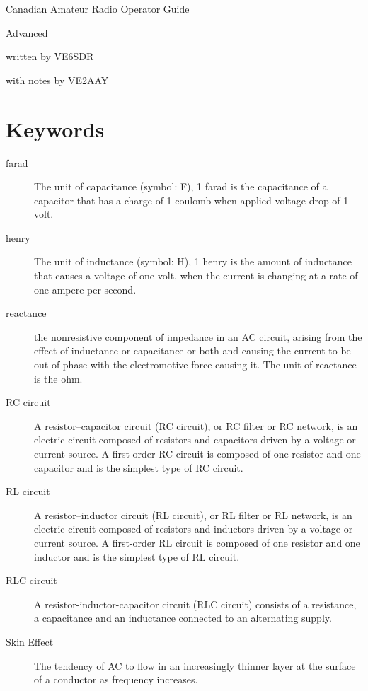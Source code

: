 \documentclass[letterpaper]{article}
\begin{document}
    \begin{center}
        \Large
        Canadian Amateur Radio Operator Guide

        Advanced

        \large
        written by VE6SDR

        with notes by VE2AAY
    \end{center}

    \tableofcontents
    \newpage

    \section*{Keywords}
        \begin{description}
            \item[farad] The unit of capacitance (symbol: F), 1 farad is the capacitance of a capacitor that has a charge of 1 coulomb when applied voltage drop of 1 volt.
            \item[henry] The unit of inductance (symbol: H), 1 henry is the amount of inductance that causes a voltage of one volt, when the current is changing at a rate of one ampere per second.
            \item[reactance] the nonresistive component of impedance in an AC circuit, arising from the effect of inductance or capacitance or both and causing the current to be out of phase with the electromotive force causing it.
                The unit of reactance is the ohm.
            \item[RC circuit] A resistor–capacitor circuit (RC circuit), or RC filter or RC network, is an electric circuit composed of resistors and capacitors driven by a voltage or current source. A first order RC circuit is composed of one resistor and one capacitor and is the simplest type of RC circuit.
            \item[RL circuit] A resistor–inductor circuit (RL circuit), or RL filter or RL network, is an electric circuit composed of resistors and inductors driven by a voltage or current source. A first-order RL circuit is composed of one resistor and one inductor and is the simplest type of RL circuit.
            \item[RLC circuit] A resistor-inductor-capacitor circuit (RLC circuit) consists of a resistance, a capacitance and an inductance connected to an alternating supply.
            \item[Skin Effect] The tendency of AC to flow in an increasingly thinner layer at the surface of a conductor as frequency increases.
        \end{description}
\end{document}
